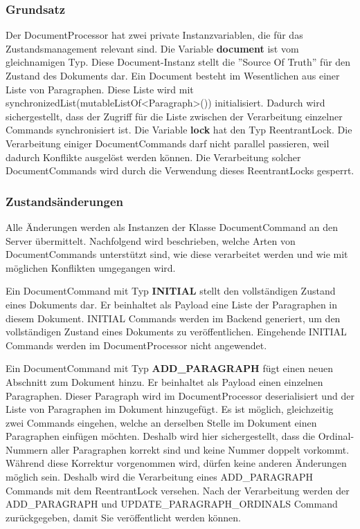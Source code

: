 \subsubsection{Grundsatz}

Der DocumentProcessor hat zwei private Instanzvariablen, die für das Zustandsmanagement relevant sind.
Die Variable \textbf{document} ist vom gleichnamigen Typ.
Diese Document-Instanz stellt die ''Source Of Truth'' für den Zustand des Dokuments dar.
Ein Document besteht im Wesentlichen aus einer Liste von Paragraphen.
Diese Liste wird mit synchronizedList(mutableListOf<Paragraph>()) initialisiert.
Dadurch wird sichergestellt, dass der Zugriff für die Liste zwischen der Verarbeitung einzelner Commands synchronisiert ist.
Die Variable \textbf{lock} hat den Typ ReentrantLock.
Die Verarbeitung einiger DocumentCommands darf nicht parallel passieren, weil dadurch Konflikte ausgelöst werden können.
Die Verarbeitung solcher DocumentCommands wird durch die Verwendung dieses ReentrantLocks gesperrt.

\subsubsection{Zustandsänderungen}

Alle Änderungen werden als Instanzen der Klasse DocumentCommand an den Server übermittelt.
Nachfolgend wird beschrieben, welche Arten von DocumentCommands unterstützt sind, wie diese verarbeitet werden und wie mit möglichen Konflikten umgegangen wird.


Ein DocumentCommand mit Typ \textbf{INITIAL} stellt den vollständigen Zustand eines Dokuments dar.
Er beinhaltet als Payload eine Liste der Paragraphen in diesem Dokument.
INITIAL Commands werden im Backend generiert, um den vollständigen Zustand eines Dokuments zu veröffentlichen.
Eingehende INITIAL Commands werden im DocumentProcessor nicht angewendet.

Ein DocumentCommand mit Typ \textbf{ADD\_PARAGRAPH} fügt einen neuen Abschnitt zum Dokument hinzu.
Er beinhaltet als Payload einen einzelnen Paragraphen.
Dieser Paragraph wird im DocumentProcessor deserialisiert und der Liste von Paragraphen im Dokument hinzugefügt.
Es ist möglich, gleichzeitig zwei Commands eingehen, welche an derselben Stelle im Dokument einen Paragraphen einfügen möchten.
Deshalb wird hier sichergestellt, dass die Ordinal-Nummern aller Paragraphen korrekt sind und keine Nummer doppelt vorkommt.
Während diese Korrektur vorgenommen wird, dürfen keine anderen Änderungen möglich sein.
Deshalb wird die Verarbeitung eines ADD\_PARAGRAPH Commands mit dem ReentrantLock versehen.
Nach der Verarbeitung werden der ADD\_PARAGRAPH und UPDATE\_PARAGRAPH\_ORDINALS Command zurückgegeben, damit Sie veröffentlicht werden können.


